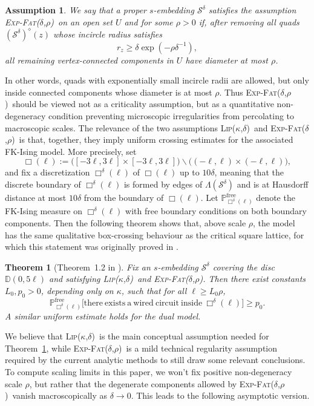 \documentclass[reqno]{amsart}
\numberwithin{equation}{section}
\newtheorem{theorem}{Theorem}[section]
\newtheorem{assumpintro}{Assumption}[section]
\theoremstyle{definition}
\theoremstyle{remark}
\newcommand\cS{\mathcal{S}}
\newcommand\dm{\diamond}
\def\LipKd{{\mbox{\textsc{Lip(}$\kappa$\textsc{,}$\delta$\textsc{)}}}}
\def\ExpFatt{{{\mbox{\textsc{Exp-Fat(}$\delta$\textsc{,}$\rho$\textsc{)}}}}}
\begin{document}
\begin{assumpintro}\label{assump:ExpFat}
We say that a proper $s$-embedding $\cS^\delta$ satisfies the assumption \ExpFatt\ on an open set $U$ and for some $\rho>0$ if, after removing all quads $(\cS^\delta)^\dm(z)$ whose incircle radius satisfies
\[
r_z \geq \delta\exp(-\rho\delta^{-1}),
\]
all remaining vertex-connected components in $U$ have diameter at most $\rho$.
\end{assumpintro}

In other words, quads with exponentially small incircle radii are allowed, but only inside connected components whose diameter is at most $\rho$. Thus \ExpFatt\ should be viewed not as a criticality assumption, but as a quantitative non-degeneracy condition preventing microscopic irregularities from percolating to macroscopic scales. The relevance of the two assumptions \LipKd\ and \ExpFatt\ is that, together, they imply uniform crossing estimates for the associated FK-Ising model. More precisely, set
\[
\Box(\ell) := \Big([-3\ell,3\ell] \times [-3\ell,3\ell]\Big) \smallsetminus \Big((-\ell,\ell)\times(-\ell,\ell)\Big),
\]
and fix a discretization $\Box^\delta(\ell)$ of $\Box(\ell)$ up to $10\delta$, meaning that the discrete boundary of $\Box^\delta(\ell)$ is formed by edges of $\Lambda(\cS^\delta)$ and is at Hausdorff distance at most $10\delta$ from the boundary of $\Box(\ell)$. Let $\mathbb{P}^{\operatorname{free}}_{\Box^\delta(\ell)}$ denote the FK-Ising measure on $\Box^\delta(\ell)$ with free boundary conditions on both boundary components. Then the following theorem shows that, above scale $\rho$, the model has the same qualitative box-crossing behaviour as the critical square lattice, for which this statement was originally proved in \cite{DCHN}.

\begin{theorem}[Theorem~1.2 in \cite{Mah23}]\label{thm:RSW-FK}
Fix an $s$-embedding $\cS^\delta$ covering the disc $\mathbb{D}(0,5\ell)$ and satisfying \LipKd\ and \ExpFatt. Then there exist constants $L_0,p_0>0$, depending only on $\kappa$, such that for all $\ell\geq L_0\rho$,
\[
 \mathbb{P}^{\operatorname{free}}_{\Box^\delta(\ell)}
 \bigl[
 \mathrm{there~exists~a~wired~circuit~inside}~\Box^\delta(\ell)
 \bigr]
 \geq p_0.
\]
A similar uniform estimate holds for the dual model.
\end{theorem}

We believe that \LipKd\ is the main conceptual assumption needed for Theorem~\ref{thm:RSW-FK}, while \ExpFatt\ is a mild technical regularity assumption required by the current analytic methods to still draw some relevant conclusions. 
To compute scaling limits in this paper, we won't fix positive non-degeneracy scale $\rho$, but rather that the degenerate components allowed by \ExpFatt\ vanish macroscopically as $\delta\to0$. This leads to the following asymptotic version.
\end{document}
